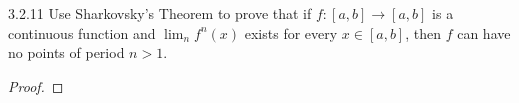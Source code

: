 \begin{problem}{3.2.11}
  Use Sharkovsky’s Theorem to prove that if $f : [a, b] \to [a, b]$ is a continuous
  function and $\lim_n f^n(x)$ exists for every $x \in [a, b]$, then $f$ can have no points of
  period $n > 1$.
\end{problem}

\begin{proof}
\end{proof}
\newpage
